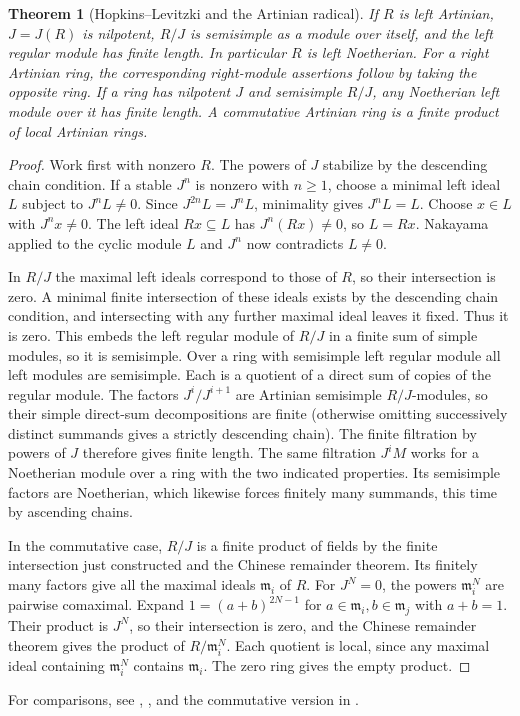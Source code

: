 \documentclass[11pt,oneside,openany]{book}
\newtheorem{theorem}{Theorem}[chapter]
\theoremstyle{definition}
\theoremstyle{remark}
\begin{document}
\begin{theorem}[Hopkins--Levitzki and the Artinian radical]
\label{p103:ALG-03-C03-S02}
If \(R\) is left Artinian, \(J=J(R)\) is nilpotent, \(R/J\)
is semisimple as a module over itself, and the left regular
module has finite length. In particular \(R\) is left Noetherian.
For a right Artinian ring, the corresponding right-module
assertions follow by taking the opposite ring.
If a ring has nilpotent \(J\) and semisimple \(R/J\), any
Noetherian left module over it has finite length.
A commutative Artinian ring is a finite product of local
Artinian rings.
\end{theorem}
\begin{proof}
Work first with nonzero \(R\). The powers of \(J\) stabilize by
the descending chain condition. If a stable \(J^n\) is nonzero
with \(n\ge1\), choose a minimal left ideal \(L\) subject to
\(J^nL\ne0\). Since \(J^{2n}L=J^nL\), minimality gives
\(J^nL=L\). Choose \(x\in L\) with \(J^nx\ne0\).
The left ideal \(Rx\subseteq L\) has \(J^n(Rx)\ne0\), so
\(L=Rx\). Nakayama applied to the cyclic module \(L\) and
\(J^n\) now contradicts \(L\ne0\).

In \(R/J\) the maximal left ideals correspond to those of \(R\),
so their intersection is zero. A minimal finite intersection of
these ideals exists by the descending chain condition, and
intersecting with any further maximal ideal leaves it fixed.
Thus it is zero. This embeds the left regular module of \(R/J\)
in a finite sum of simple modules, so it is semisimple.
Over a ring with semisimple left regular module all left modules
are semisimple. Each is a quotient of a direct sum of copies of
the regular module. The factors \(J^i/J^{i+1}\) are Artinian
semisimple \(R/J\)-modules, so their simple direct-sum
decompositions are finite (otherwise omitting successively
distinct summands gives a strictly descending chain).
The finite filtration by powers of \(J\) therefore gives finite
length. The same filtration \(J^iM\) works for a Noetherian
module over a ring with the two indicated properties.
Its semisimple factors are Noetherian, which likewise forces
finitely many summands, this time by ascending chains.

In the commutative case, \(R/J\) is a finite product of fields
by the finite intersection just constructed and the Chinese
remainder theorem. Its finitely many factors give all the maximal
ideals \(\mathfrak m_i\) of \(R\). For \(J^N=0\), the powers
\(\mathfrak m_i^N\) are pairwise comaximal. Expand
\(1=(a+b)^{2N-1}\) for \(a\in\mathfrak m_i,b\in\mathfrak m_j\)
with \(a+b=1\). Their product is \(J^N\), so their intersection
is zero, and the Chinese remainder theorem gives the product
of \(R/\mathfrak m_i^N\). Each quotient is local, since any
maximal ideal containing \(\mathfrak m_i^N\) contains
\(\mathfrak m_i\). The zero ring gives the empty product.
\end{proof}
For comparisons, see \cite[Notes to the Reader and Section 3K]{lam},
\cite[Section 18.2]{dummit}, and the commutative version in
\cite[Theorem 2.14 and Corollaries 2.16--2.19]{eisenbud}.
\end{document}
